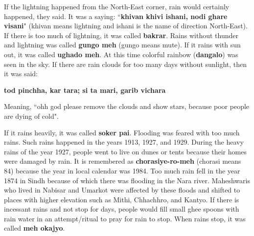 If the lightning happened from the North-East corner, rain would certainly
happened, they said. It was a saying: ``\textbf{khivan khivi ishani, nodi ghare
visani}" (khivan means lightning and ishani is the name of direction
North-East). If there is too much of lightning, it was called \textbf{bakrar}.
Rains without thunder and lightning was called \textbf{gungo meh} (gungo means
mute). If it rains with sun out, it was called \textbf{ughado meh}. At this
time colorful rainbow (\textbf{dangalo}) was seen in the sky. If there are rain
clouds for too many days without sunlight, then it was said:

\textbf{tod pinchha, kar tara; si ta mari, garib vichara}

Meaning, ``ohh god please remove the clouds and show stars, because poor people
are dying of cold".

If it rains heavily, it was called \textbf{soker pai}. Flooding was feared with
too much rains. Such rains happened in the years 1913, 1927, and 1929. During
the heavy rains of the year 1927, people went to live on dunes or tents because
their homes were damaged by rain. It is remembered as \textbf{chorasiye-ro-meh}
(chorasi means 84) because the year in local calendar was 1984. Too much rain
fell in the year 1874 in Sindh because of which there was flooding in the Nara
river. Maheshwaris who lived in Nabisar and Umarkot were affected by these
floods and shifted to places with higher elevation such as Mithi, Chhachhro,
and Kantyo. If there is incessant rains and not stop for days, people would
fill small ghee spoons with rain water in an attempt/ritual to pray for rain to
stop. When rains stop, it was called \textbf{meh okajyo}. 

